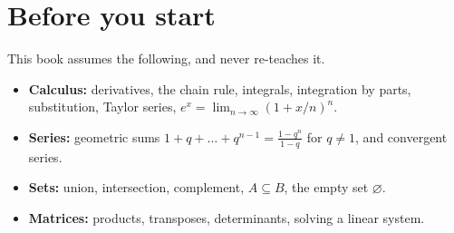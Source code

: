 \chapter{Before you start}

\begin{prereq}
This book assumes the following, and never re-teaches it.
\begin{itemize}
  \item \textbf{Calculus:} derivatives, the chain rule, integrals, integration by parts, substitution, Taylor series, $e^x=\lim_{n\to\infty}(1+x/n)^n$.
  \item \textbf{Series:} geometric sums $1+q+\dots+q^{n-1}=\frac{1-q^n}{1-q}$ for $q\ne1$, and convergent series.
  \item \textbf{Sets:} union, intersection, complement, $A\subseteq B$, the empty set $\varnothing$.
  \item \textbf{Matrices:} products, transposes, determinants, solving a linear system.
\end{itemize}
\end{prereq}

